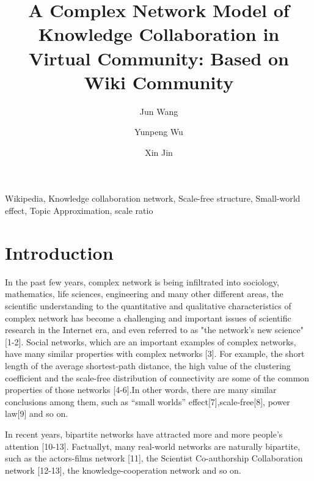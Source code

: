 \documentclass{elsarticle}
\begin{document}
\begin{frontmatter}
\title{A Complex Network Model of Knowledge Collaboration in Virtual Community: Based on Wiki Community
}
\author[buaa]{Jun Wang}

\author[buaa]{Yunpeng Wu}

\author[buaa]{Xin Jin}

\address[buaa]{School of Economics and Management, Beihang University, 
Beijing 100083, P.R. China}

\begin{abstract}
  
\end{abstract}

\begin{keyword}
Wikipedia, Knowledge collaboration network, Scale-free structure,
Small-world effect, Topic Approximation, scale ratio
  
\end{keyword}
\end{frontmatter}

\section{Introduction}
\label{sec:introduction}

In the past few years, complex network is being infiltrated into sociology, mathematics, life sciences, engineering and many other different areas, the scientific understanding to the quantitative and qualitative characteristics of complex network has become a challenging and important issues of scientific research in the Internet era, and even referred to as "the network's new science"[1-2]. Social networks, which are an important examples of complex networks, have many similar properties with complex networks [3]. For example, the short length of the average shortest-path distance, the high value of the clustering coefficient and the scale-free distribution of connectivity are some of the common properties of those networks [4-6].In other words, there are many similar conclusions among them, such as “small worlds” effect[7],scale-free[8], power law[9] and so on. 

In recent years, bipartite networks have attracted more and more people's attention [10-13]. Factuallyt, many real-world networks are naturally bipartite, such as the actors-films network [11], the Scientist Co-authorship Collaboration network [12-13], the knowledge-cooperation network and so on.
\end{document}
